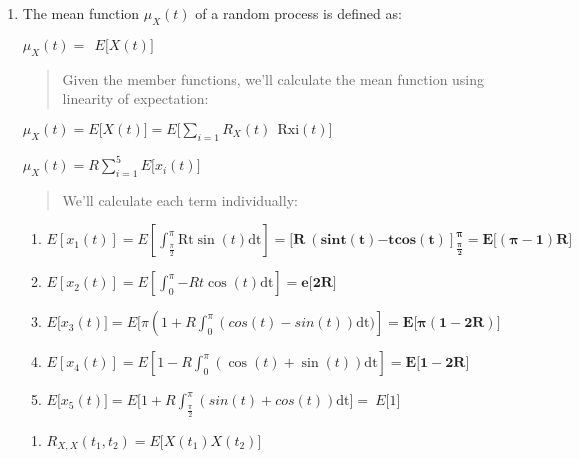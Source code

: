 \documentclass{article}
\begin{document}
\begin{enumerate}
\item
    The mean function \(\mu_{X}(t)\) of a random process is defined as:

    $\mu_{X}(t) = \ \ E\lbrack X(t)\rbrack$

    \begin{quote}
        Given the member functions, we'll calculate the mean function using
        linearity of expectation:
    \end{quote}

    $\mu_{X}(t) = E\lbrack X(t)\rbrack = E\mathbf{\lbrack}\sum_{i = 1}^{}{R_{X}(t)\ }\ \text{Rxi}(t)\mathbf{\rbrack}$

    $\mu_{X}(t) = R\sum_{i = 1}^{5}{E\lbrack x_{i}(t)\rbrack}$

    \begin{quote}
        We'll calculate each term individually:
    \end{quote}

    \begin{enumerate}
    \def\labelenumi{\arabic{enumi}.}
    \item
        \(E\left\lbrack x_{1}(t) \right\rbrack = E\left\lbrack \int_{\frac{\pi}{2}}^{\pi}{\text{Rt}\sin(t)\text{dt}} \right\rbrack\mathbf{= \lbrack R\ }\left( \mathbf{\text{sint}}\left( \mathbf{t} \right)\mathbf{- tcos}\left( \mathbf{t} \right) \right\rbrack_{\frac{\mathbf{\pi}}{\mathbf{2}}}^{\mathbf{\pi}}\mathbf{=}\mathbf{E\lbrack}\left( \mathbf{\pi - 1} \right)\mathbf{R}\mathbf{\rbrack}\)
    \item
        \(E\left\lbrack x_{2}(t) \right\rbrack = E\left\lbrack \int_{0}^{\pi}{- Rt\cos(t)\text{dt}} \right\rbrack\mathbf{= e\lbrack 2}\mathbf{R\rbrack}\)
    \item
        \(E\lbrack x_{3}(t)\rbrack = E\mathbf{\lbrack}\pi\left( 1 + R\int_{0}^{\pi}{(cos(t) - sin(t))\text{dt}\mathbf{)}} \right\rbrack\mathbf{= E\lbrack\pi}\left( \mathbf{1 - 2}\mathbf{R} \right)\mathbf{\rbrack}\)
    \item
        \(E\left\lbrack x_{4}(t) \right\rbrack = E\left\lbrack 1 - R\int_{0}^{\pi}{\left( \cos(t) + \sin(t) \right)\text{dt}} \right\rbrack\mathbf{= E\lbrack 1 - 2}\mathbf{R\rbrack\ }\)
    \item
        \(E\lbrack x_{5}(t)\rbrack = E\mathbf{\lbrack}1 + R\int_{\frac{\pi}{2}}^{\pi}{(sin(t) + cos(t))\text{dt}\mathbf{\rbrack}} = \ E\lbrack 1\rbrack\)
    \end{enumerate}

    \begin{enumerate}
    \item
        \(R_{X,X}(t_{1},t_{2}) = E\lbrack X(t_{1})X(t_{2})\rbrack\)


\end{enumerate}
\end{enumerate}
\end{document}
